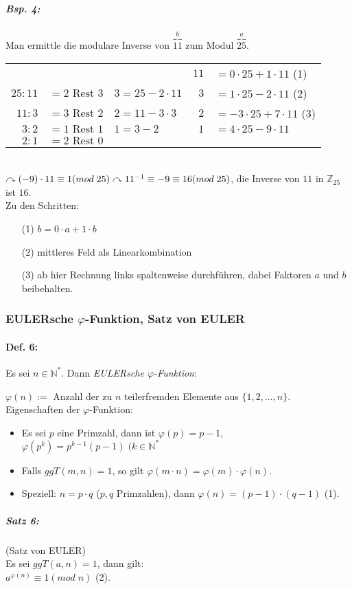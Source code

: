 \subparagraph{Bsp. 4:} \parskp
Man ermittle die modulare Inverse von $\overbrace{11}^b$ zum Modul $\overbrace{25}^a$. \medskip\\
\begin{tabular}{r l | l | r l}
				&				&						&	$11$&$=0 \cdot 25 + 1 \cdot 11$ (1)\\
$25:11 $&$= 2 \text{ Rest }  3$	&	$3=25-2 \cdot 11$	&	$3 $&$= 1 \cdot 25 - 2 \cdot 11$ (2)\\
$11: 3 $&$= 3 \text{ Rest } 2$		&	$2= 11-3 \cdot 3$	&	$2 $&$= -3 \cdot 25 + 7 \cdot 11$ (3)\\
$3:2 $&$= 1 \text{ Rest } 1$		&	$1 = 3-2$			&	$\boxed{1} $&$= 4 \cdot 25 - 9 \cdot 11$\\
$2 : 1 $&$= 2 \text{ Rest }  0$	&						& &\\
\end{tabular} \medskip\\
$\curvearrowright (-9) \cdot 11 \equiv 1 (mod \; 25)\\
\curvearrowright 11^{-1} \equiv -9 \equiv 16 (mod \; 25)$, die Inverse von $11$ in $\mathbb{Z}_{25}$ ist $16$.\\
Zu den Schritten:
\begin{itemize}
\item [(1)] $b=0 \cdot a + 1 \cdot b$
\item [(2)] mittleres Feld als Linearkombination
\item [(3)] ab hier Rechnung links spaltenweise durchführen, dabei Faktoren $a$ und $b$ beibehalten. 
\end{itemize}
\subsubsection*{EULERsche $\varphi$-Funktion, Satz von EULER}
\paragraph{Def. 6:} \parskp
Es sei $n \in \mathbb{N}^*$. Dann \emph{EULERsche $\varphi$-Funktion}:

$\varphi(n):=$ Anzahl der zu $n$ teilerfremden Elemente aus $\{1,2,...,n\}$.
Eigenschaften der $\varphi$-Funktion:
\begin{itemize}
\item Es sei $p$ eine Primzahl, dann ist $\boxed{\varphi(p)=p-1}$, $\boxed{\varphi(p^k)=p^{k-1}(p-1)} \; (k \in \mathbb{N}^*$
\item Falls $ggT (m, n) =1$, so gilt $\varphi (m\cdot n) = \varphi (m) \cdot \varphi (n)$.
\item Speziell: $n=p\cdot q $ ($p,q$ Primzahlen), dann $\boxed{\varphi(n)=(p-1)\cdot (q-1)}$ (1).
\end{itemize}
\subparagraph{Satz 6:} (Satz von EULER)\\
Es sei $ggT(a,n)=1$, dann gilt:\\
$\boxed{a^{\varphi(n)}\equiv 1 (mod \; n)}$ (2).

